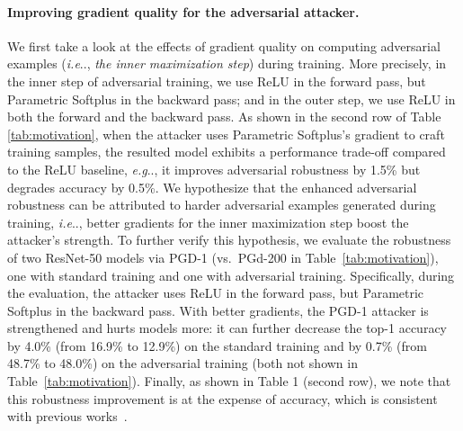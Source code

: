 \documentclass{article}
\makeatletter
\DeclareRobustCommand\onedot{\futurelet\@let@token\@onedot}
\def\@onedot{\ifx\@let@token.\else.\null\fi\xspace}
\def\eg{\emph{e.g}\onedot} \def\Eg{\emph{E.g}\onedot}
\def\ie{\emph{i.e}\onedot} \def\Ie{\emph{I.e}\onedot}
\makeatother
\begin{document}
\paragraph{Improving gradient quality for the adversarial attacker.} We first take a look at the effects of gradient quality on computing adversarial examples (\ie, \emph{the inner maximization step}) during training. More precisely, in the inner step of adversarial training, we use ReLU in the forward pass, but Parametric Softplus in the backward pass; and in the outer step, we use ReLU in both the forward and the backward pass. As shown in the second row of Table \ref{tab:motivation}, when the attacker uses Parametric Softplus's gradient to craft training samples, the resulted model exhibits a performance trade-off compared to the ReLU baseline, \eg, it improves adversarial robustness by 1.5\% but degrades accuracy by 0.5\%. We hypothesize that the enhanced adversarial robustness can be attributed to harder adversarial examples generated during training, \ie, better gradients for the inner maximization step boost the attacker's strength. To further verify this hypothesis, we evaluate the robustness of two ResNet-50 models via PGD-1 (vs.\ PGd-200 in Table~\ref{tab:motivation}), one with standard training and one with adversarial training. Specifically, during the evaluation, the attacker uses ReLU in the forward pass, but Parametric Softplus in the backward pass. With better gradients, the PGD-1 attacker is strengthened and hurts models more: it can further decrease the top-1 accuracy by 4.0\% (from 16.9\% to 12.9\%) on the standard training and by 0.7\% (from 48.7\% to 48.0\%) on the adversarial training (both not shown in Table~\ref{tab:motivation}). Finally, as shown in Table 1 (second row), we note that this robustness improvement is at the expense of  accuracy, which is consistent with previous works~\cite{wang2019a}.
\end{document}
